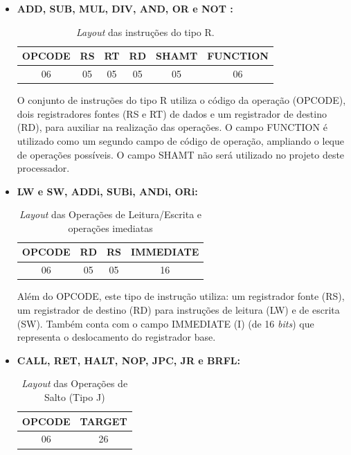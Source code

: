 \documentclass{report}
\begin{document}
  \begin{itemize}
     
     \item \textbf{ADD, SUB, MUL, DIV, AND, OR e NOT :}

  \begin{table}[H]
\centering
	\begin{tabular}{|c|c|c|c|c|c|}
  	\hline 
  	\textbf{OPCODE} & \textbf{RS} & \textbf{RT} & \textbf{RD} & \textbf{SHAMT} & \textbf{FUNCTION} \\ 
  	\hline 
  	06 & 05 & 05 & 05 & 05 & 06 \\ 
  	\hline 
  	\end{tabular} 
  	\caption{\textit{Layout} das instruções do tipo R.}
  \end{table}
  
  O conjunto de instruções do tipo R utiliza o código da operação (OPCODE), dois registradores fontes (RS e RT) de dados e um registrador de destino (RD), para auxiliar na realização das operações. O campo FUNCTION é utilizado como um segundo campo de código de operação, ampliando o leque de operações possíveis. O campo SHAMT não será utilizado no projeto deste processador.\\
  
   \item \textbf{LW e SW, ADDi, SUBi, ANDi, ORi:}

  \begin{table}[H]
\centering
	\begin{tabular}{|c|c|c|c|}
  	\hline 
  	\textbf{OPCODE} & \textbf{RD} & \textbf{RS} & \textbf{IMMEDIATE}  \\ 
  	\hline 
  	06 & 05 & 05 & 16 \\ 
  	\hline 
  	\end{tabular} 
  	\caption{\textit{Layout} das Operações de Leitura/Escrita e operações imediatas}
  \end{table}
  
  Além do OPCODE, este tipo de instrução utiliza: um registrador fonte (RS), um registrador de destino (RD) para instruções de leitura (LW) e de escrita (SW). Também conta com o campo IMMEDIATE (I) (de 16 \textit{bits}) que representa o deslocamento do registrador base.\\
  
  \item \textbf{CALL, RET, HALT, NOP, JPC, JR e BRFL:}

  \begin{table}[H]
\centering
	\begin{tabular}{|c|c|}
  	\hline 
  	\textbf{OPCODE} & \textbf{TARGET} \\ 
  	\hline 
  	06 & 26 \\ 
  	\hline 
  	\end{tabular} 
  	\caption{\textit{Layout} das Operações de Salto (Tipo J)}
  \end{table}
  

\end{itemize}
\end{document}
